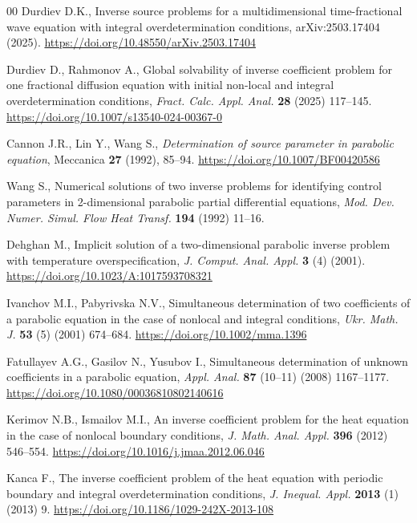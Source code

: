 \documentclass[reqno]{amsart}
\begin{document}
\begin{thebibliography}{00}
Durdiev D.K., Inverse source problems for a multidimensional time-fractional wave equation with integral overdetermination conditions, arXiv:2503.17404 (2025). \url{https://doi.org/10.48550/arXiv.2503.17404}

Durdiev D., Rahmonov A., Global solvability of inverse coefficient problem for one fractional diffusion equation with initial non-local and integral overdetermination conditions,  \textit{Fract. Calc. Appl. Anal.} \textbf{28} (2025) 117--145. \url{https://doi.org/10.1007/s13540-024-00367-0}

Cannon J.R., Lin Y., Wang S., \textit{Determination of source parameter in parabolic equation}, 
Meccanica \textbf{27} (1992), 85--94.
\url{https://doi.org/10.1007/BF00420586}

Wang S., Numerical solutions of two inverse problems for identifying control parameters in 2-dimensional parabolic partial differential equations, \textit{Mod. Dev. Numer. Simul. Flow Heat Transf.} \textbf{194} (1992) 11--16.

Dehghan M., Implicit solution of a two-dimensional parabolic inverse problem with temperature overspecification, \textit{J. Comput. Anal. Appl.} \textbf{3} (4) (2001). \url{https://doi.org/10.1023/A:1017593708321}

Ivanchov M.I., Pabyrivska N.V., Simultaneous determination of two coefficients of a parabolic equation in the case of nonlocal and integral conditions, \textit{Ukr. Math. J.} \textbf{53} (5) (2001) 674--684. \url{https://doi.org/10.1002/mma.1396}

Fatullayev A.G., Gasilov N., Yusubov I., Simultaneous determination of unknown coefficients in a parabolic equation, \textit{Appl. Anal.} \textbf{87} (10--11) (2008) 1167--1177. \url{https://doi.org/10.1080/00036810802140616}

Kerimov N.B., Ismailov M.I., An inverse coefficient problem for the heat equation in the case of nonlocal boundary conditions,  \textit{J. Math. Anal. Appl.} \textbf{396} (2012) 546--554. \url{https://doi.org/10.1016/j.jmaa.2012.06.046}

Kanca F., The inverse coefficient problem of the heat equation with periodic boundary and integral overdetermination conditions, \textit{J. Inequal. Appl.} \textbf{2013} (1) (2013) 9. \url{https://doi.org/10.1186/1029-242X-2013-108}


\end{thebibliography}
\end{document}
